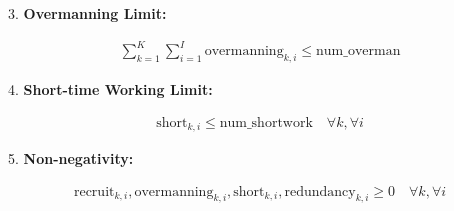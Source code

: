 \documentclass{article}
\begin{document}
3. \textbf{Overmanning Limit:}

\begin{align*}
\sum_{k=1}^{K} \sum_{i=1}^{I} \text{overmanning}_{k,i} \leq \text{num\_overman}
\end{align*}

4. \textbf{Short-time Working Limit:}

\begin{align*}
\text{short}_{k,i} \leq \text{num\_shortwork} \quad \forall k, \forall i
\end{align*}

5. \textbf{Non-negativity:}

\begin{align*}
\text{recruit}_{k,i}, \text{overmanning}_{k,i}, \text{short}_{k,i}, \text{redundancy}_{k,i} \geq 0 \quad \forall k, \forall i
\end{align*}
\end{document}
